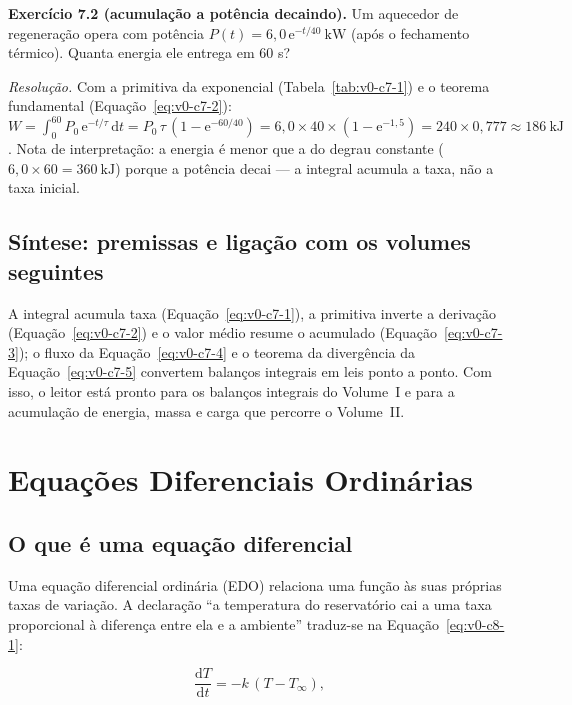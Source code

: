 \documentclass[12pt,a4paper]{article}
\numberwithin{equation}{section}
\numberwithin{table}{section}
\numberwithin{figure}{section}
\begin{document}
\textbf{Exercício 7.2 (acumulação a potência decaindo).} Um aquecedor de
regeneração opera com potência $P(t) = 6{,}0\,\mathrm{e}^{-t/40}\ \mathrm{kW}$
(após o fechamento térmico). Quanta energia ele entrega em 60 s?

\emph{Resolução.} Com a primitiva da exponencial (Tabela~\ref{tab:v0-c7-1})
e o teorema fundamental (Equação~\eqref{eq:v0-c7-2}):
$W = \int_0^{60} P_0\,\mathrm{e}^{-t/\tau}\,\mathrm{d}t =
P_0\,\tau\,(1 - \mathrm{e}^{-60/40}) =
6{,}0 \times 40 \times (1 - \mathrm{e}^{-1{,}5}) =
240 \times 0{,}777 \approx 186\ \mathrm{kJ}$. Nota de interpretação: a
energia é menor que a do degrau constante ($6{,}0 \times 60 =
360\ \mathrm{kJ}$) porque a potência decai --- a integral acumula a
taxa, não a taxa inicial.

\subsection{Síntese: premissas e ligação com os volumes seguintes}

A integral acumula taxa (Equação~\eqref{eq:v0-c7-1}), a primitiva inverte a
derivação (Equação~\eqref{eq:v0-c7-2}) e o valor médio resume o
acumulado (Equação~\eqref{eq:v0-c7-3}); o fluxo da
Equação~\eqref{eq:v0-c7-4} e o teorema da divergência da
Equação~\eqref{eq:v0-c7-5} convertem balanços integrais em leis
ponto a ponto. Com isso, o leitor está pronto
para os balanços integrais do Volume~I e para a acumulação de energia,
massa e carga que percorre o Volume~II.


\clearpage
\section{Equações Diferenciais Ordinárias}\label{sec:v0-edo}

\subsection{O que é uma equação diferencial}

Uma equação diferencial ordinária (EDO) relaciona uma função às suas
próprias taxas de variação. A declaração ``a temperatura do reservatório
cai a uma taxa proporcional à diferença entre ela e a ambiente'' traduz-se
na Equação~\eqref{eq:v0-c8-1}:

\begin{equation}\label{eq:v0-c8-1}
\frac{\mathrm{d}T}{\mathrm{d}t} = -k\,(T - T_{\infty}),
\end{equation}
\end{document}
